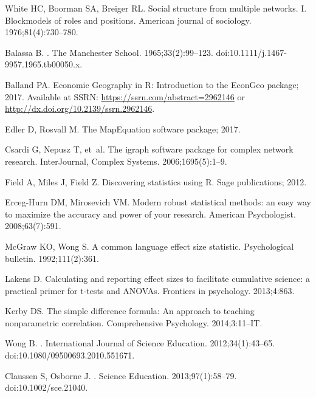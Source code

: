 \begin{thebibliography}{10}
White HC, Boorman SA, Breiger RL.
\newblock Social structure from multiple networks. I. Blockmodels of roles and positions.
\newblock American journal of sociology. 1976;81(4):730--780.

Balassa B.
.
\newblock The Manchester School. 1965;33(2):99--123.
\newblock doi:{10.1111/j.1467-9957.1965.tb00050.x}.

Balland PA. Economic Geography in R: Introduction to the EconGeo package; 2017.
\newblock Available at SSRN: \url{https://ssrn.com/abstract=2962146} or
  \url{http://dx.doi.org/10.2139/ssrn.2962146}.

Edler D, Rosvall M. The MapEquation software package; 2017.

Csardi G, Nepusz T, et~al.
\newblock The igraph software package for complex network research.
\newblock InterJournal, Complex Systems. 2006;1695(5):1--9.

Field A, Miles J, Field Z.
\newblock Discovering statistics using R.
\newblock Sage publications; 2012.

Erceg-Hurn DM, Mirosevich VM.
\newblock Modern robust statistical methods: an easy way to maximize the accuracy and power of your research.
\newblock American Psychologist. 2008;63(7):591.

McGraw KO, Wong S.
\newblock A common language effect size statistic.
\newblock Psychological bulletin. 1992;111(2):361.

Lakens D.
\newblock Calculating and reporting effect sizes to facilitate cumulative science: a practical primer for t-tests and ANOVAs.
\newblock Frontiers in psychology. 2013;4:863.

Kerby DS.
\newblock The simple difference formula: An approach to teaching nonparametric correlation.
\newblock Comprehensive Psychology. 2014;3:11--IT.

Wong B.
.
\newblock International Journal of Science Education. 2012;34(1):43--65.
\newblock doi:{10.1080/09500693.2010.551671}.

Claussen S, Osborne J.
.
\newblock Science Education. 2013;97(1):58--79.
\newblock doi:{10.1002/sce.21040}.


\end{thebibliography}
